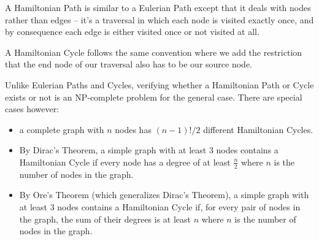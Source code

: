 A Hamiltonian Path is similar to a Eulerian Path except that it deals with nodes rather than edges -- it's a traversal in which each node is visited exactly once, and by consequence each edge is either visited once or not visited at all.

A Hamiltonian Cycle follows the same convention where we add the restriction that the end node of our traversal also has to be our source node.

Unlike Eulerian Paths and Cycles, verifying whether a Hamiltonian Path or Cycle exists or not is an NP-complete problem for the general case. There are special cases however:
\begin{itemize}
\item a complete graph with $n$ nodes has $(n-1)!/2$ different Hamiltonian Cycles.
\item By Dirac's Theorem, a simple graph with at least 3 nodes contains a Hamiltonian Cycle if every node has a degree of at least $\frac{n}{2}$ where $n$ is the number of nodes in the graph.
\item By Ore's Theorem (which generalizes Dirac's Theorem), a simple graph with at least 3 nodes contains a Hamiltonian Cycle if, for every pair of nodes in the graph, the sum of their degrees is at least $n$ where $n$ is the number of nodes in the graph.
\end{itemize}